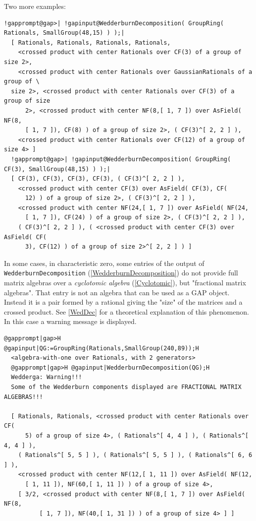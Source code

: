 \documentclass[a4paper,11pt]{report}
\begin{document}
{{ Two more examples: 
\begin{Verbatim}[commandchars=!@|,fontsize=\small,frame=single,label=Example]
  !gapprompt@gap>| !gapinput@WedderburnDecomposition( GroupRing( Rationals, SmallGroup(48,15) ) );|
  [ Rationals, Rationals, Rationals, Rationals, 
    <crossed product with center Rationals over CF(3) of a group of size 2>, 
    <crossed product with center Rationals over GaussianRationals of a group of \
  size 2>, <crossed product with center Rationals over CF(3) of a group of size 
      2>, <crossed product with center NF(8,[ 1, 7 ]) over AsField( NF(8,
      [ 1, 7 ]), CF(8) ) of a group of size 2>, ( CF(3)^[ 2, 2 ] ), 
    <crossed product with center Rationals over CF(12) of a group of size 4> ]
  !gapprompt@gap>| !gapinput@WedderburnDecomposition( GroupRing( CF(3), SmallGroup(48,15) ) );|
  [ CF(3), CF(3), CF(3), CF(3), ( CF(3)^[ 2, 2 ] ), 
    <crossed product with center CF(3) over AsField( CF(3), CF(
      12) ) of a group of size 2>, ( CF(3)^[ 2, 2 ] ), 
    <crossed product with center NF(24,[ 1, 7 ]) over AsField( NF(24,
      [ 1, 7 ]), CF(24) ) of a group of size 2>, ( CF(3)^[ 2, 2 ] ), 
    ( CF(3)^[ 2, 2 ] ), ( <crossed product with center CF(3) over AsField( CF(
      3), CF(12) ) of a group of size 2>^[ 2, 2 ] ) ]
\end{Verbatim}
 In some cases, in characteristic zero, some entries of the output of \texttt{WedderburnDecomposition} (\ref{WedderburnDecomposition}) do not provide full matrix algebras over a \emph{cyclotomic algebra} (\ref{Cyclotomic}), but "fractional matrix algebras". That entry is not an algebra that can be
used as a \textsf{GAP} object. Instead it is a pair formed by a rational giving the "size" of the
matrices and a crossed product. See \ref{WedDec} for a theoretical explanation of this phenomenon. In this case a warning
message is displayed. 
\begin{Verbatim}[commandchars=@|H,fontsize=\small,frame=single,label=Example]
  @gapprompt|gap>H @gapinput|QG:=GroupRing(Rationals,SmallGroup(240,89));H
  <algebra-with-one over Rationals, with 2 generators>
  @gapprompt|gap>H @gapinput|WedderburnDecomposition(QG);H
  Wedderga: Warning!!!
  Some of the Wedderburn components displayed are FRACTIONAL MATRIX ALGEBRAS!!!
  
  [ Rationals, Rationals, <crossed product with center Rationals over CF(
      5) of a group of size 4>, ( Rationals^[ 4, 4 ] ), ( Rationals^[ 4, 4 ] ),
    ( Rationals^[ 5, 5 ] ), ( Rationals^[ 5, 5 ] ), ( Rationals^[ 6, 6 ] ),
    <crossed product with center NF(12,[ 1, 11 ]) over AsField( NF(12,
      [ 1, 11 ]), NF(60,[ 1, 11 ]) ) of a group of size 4>,
    [ 3/2, <crossed product with center NF(8,[ 1, 7 ]) over AsField( NF(8,
          [ 1, 7 ]), NF(40,[ 1, 31 ]) ) of a group of size 4> ] ]  
\end{Verbatim}
  

}}
\end{document}
